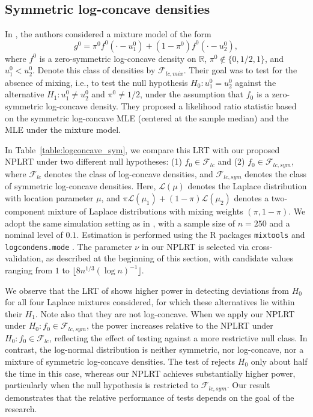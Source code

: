 \documentclass[12pt,letterpaper, twoside, openany]{article}
\theoremstyle{plain}
\begin{document}
\subsection{Symmetric log-concave densities}\label{subsect:symmetric_lc}
In \cite{balabdaoui2018inference}, the authors considered a mixture model of the form
\begin{equation*}
    g^0 = \pi^0 f^0(\cdot - u_1^0) + (1- \pi^0) f^0(\cdot - u_2^0),
\end{equation*}
where $f^0$ is a zero-symmetric log-concave density on $\mathbb{R}$, $\pi^0 \notin \{0, 1/2, 1\}$, and $u_1^0 < u_2^0$. Denote this class of densities by $\mathcal{F}_{lc,mix}$. Their goal was to test for the absence of mixing, i.e., to test the null hypothesis $H_0: u_1^0 = u_2^0$ against the alternative $H_1: u_1^0 \neq u_2^0$ and $\pi^0 \neq 1/2$, under the assumption that $f_0$ is a zero-symmetric log-concave density. They proposed a likelihood ratio statistic based on the symmetric log-concave MLE (centered at the sample median) and the MLE under the mixture model.

In Table~\ref{table:logconcave_sym}, we compare this LRT with our proposed NPLRT under two different null hypotheses: (1) $f_0 \in \mathcal{F}_{lc}$ and (2) $f_0 \in \mathcal{F}_{lc,sym}$, where $\mathcal{F}_{lc}$ denotes the class of log-concave densities, and $\mathcal{F}_{lc,sym}$ denotes the class of symmetric log-concave densities.
 Here, $\mathcal{L}(\mu)$ denotes the Laplace distribution with location parameter $\mu$, and $\pi \mathcal{L}(\mu_1) + (1 - \pi) \mathcal{L}(\mu_2)$ denotes a two-component mixture of Laplace distributions with mixing weights $(\pi, 1 - \pi)$. We adopt the same simulation setting as in \cite{balabdaoui2018inference}, with a sample size of $n = 250$ and a nominal level of $0.1$. Estimation is performed using the R packages \texttt{mixtools} \citep{tatiana2009mixtools} and \texttt{logcondens.mode} \citep{lcmode}. The parameter $\nu$ in our NPLRT is selected via cross-validation, as described at the beginning of this section, with candidate values ranging from $1$ to $\lfloor 8 n^{1/3}(\log n)^{-1} \rfloor$.


We observe that the LRT of \cite{balabdaoui2018inference} shows higher power in detecting deviations from $H_0$ for all four Laplace mixtures considered, for which these alternatives lie within their $H_1$. Note also that they are not log-concave. When we apply our NPLRT under $H_0: f_0 \in \mathcal{F}_{lc,sym}$, the power increases relative to the NPLRT under $H_0: f_0 \in \mathcal{F}_{lc}$, reflecting the effect of testing against a more restrictive null class.
%
In contrast, the log-normal distribution is neither symmetric, nor log-concave, nor a mixture of symmetric log-concave densities. The test of \cite{balabdaoui2018inference} rejects $H_0$ only about half the time in this case, whereas our NPLRT achieves substantially higher power, particularly when the null hypothesis is restricted to $\mathcal{F}_{lc,sym}$. Our result demonstrates that the relative performance of tests depends on the goal of the research.
\end{document}
